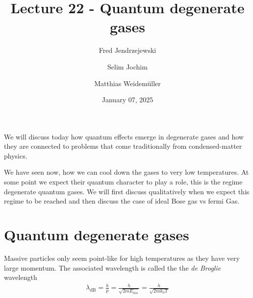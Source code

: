 \documentclass[10pt]{article}
\renewenvironment{abstract}
  {{\bfseries\noindent{\abstractname}\par\nobreak}\footnotesize}
  {\bigskip}
\begin{document}
\title{Lecture 22 - Quantum degenerate gases}



\author[1]{Fred Jendrzejewski}%
\author[2]{Selim Jochim}%
\author[2]{Matthias Weidemüller}%
%
%


\vspace{-1em}



  
  \date{January 07, 2025}


\begingroup
\let\center\flushleft
\let\endcenter\endflushleft
\maketitle
\endgroup





\begin{abstract}
We will discuss today how quantum effects emerge in degenerate gases and how they are connected to problems that come traditionally from condensed-matter physics.%
\end{abstract}%



\sloppy


We have seen now, how we can cool down the gases to very low temperatures. At some point we expect their quantum character to play a role, this is the regime degenerate quantum gases. We will first discuss qualitatively when we expect this regime to be reached and then discuss the case of ideal Bose gas vs fermi Gas.

\section{Quantum degenerate gases}
Massive particles only seem point-like for high temperatures as they have very large momentum. The associated wavelength is called the the \textit{de Broglie} wavelength
%
\begin{align}
\lambda_\text{dB} = \frac{h}{p} = \frac{h}{\sqrt{2mE_{kin}}} = \frac{h}{\sqrt{2mk_\textrm{b}T}}
\end{align}
\end{document}
